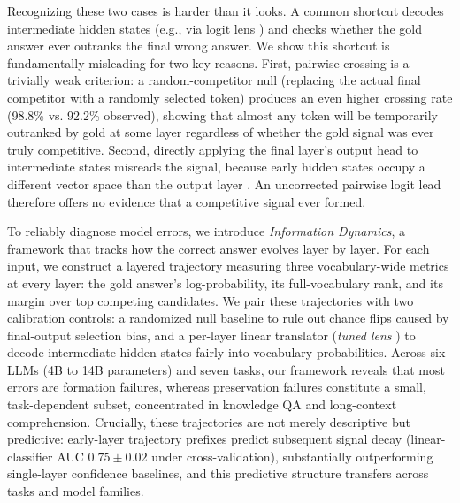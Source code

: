 \documentclass{article} %
\begin{document}
Recognizing these two cases is harder than it looks. A common shortcut decodes intermediate hidden states (e.g., via logit lens \citep{nostalgebraist2020logitlens}) and checks whether the gold answer ever outranks the final wrong answer. We show this shortcut is fundamentally misleading for two key reasons. First, pairwise crossing is a trivially weak criterion: a random-competitor null (replacing the actual final competitor with a randomly selected token) produces an even higher crossing rate (98.8\% vs. 92.2\% observed), showing that almost any token will be temporarily outranked by gold at some layer regardless of whether the gold signal was ever truly competitive. Second, directly applying the final layer's output head to intermediate states misreads the signal, because early hidden states occupy a different vector space than the output layer \citep{belrose2023tunedlens, din2023jump}. An uncorrected pairwise logit lead therefore offers no evidence that a competitive signal ever formed.

To reliably diagnose model errors, we introduce \emph{Information Dynamics}, a framework that tracks how the correct answer evolves layer by layer. For each input, we construct a layered trajectory measuring three vocabulary-wide metrics at every layer: the gold answer's log-probability, its full-vocabulary rank, and its margin over top competing candidates. We pair these trajectories with two calibration controls: a randomized null baseline to rule out chance flips caused by final-output selection bias, and a per-layer linear translator (\emph{tuned lens} \citep{belrose2023tunedlens}) to decode intermediate hidden states fairly into vocabulary probabilities. Across six LLMs (4B to 14B parameters) and seven tasks, our framework reveals that most errors are formation failures, whereas preservation failures constitute a small, task-dependent subset, concentrated in knowledge QA and long-context comprehension. Crucially, these trajectories are not merely descriptive but predictive: early-layer trajectory prefixes predict subsequent signal decay (linear-classifier AUC $0.75 \pm 0.02$ under cross-validation), substantially outperforming single-layer confidence baselines, and this predictive structure transfers across tasks and model families.
\end{document}
